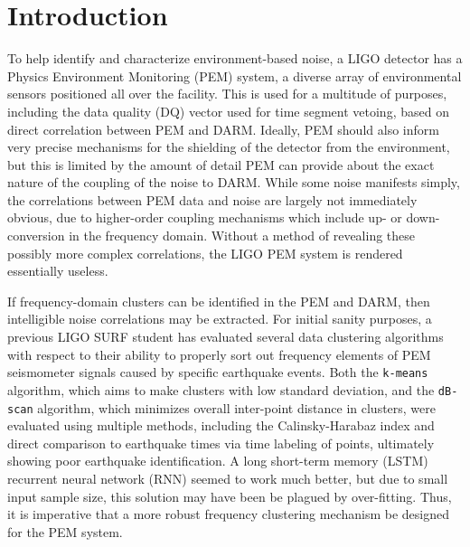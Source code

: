 \documentclass[colorlinks=true,pdfstartview=FitV,linkcolor=blue,
            citecolor=red,urlcolor=magenta]{ligodoc}
\title{}
\author{Jacob Bernhardt}
\begin{document}

\section{Introduction}

To help identify and characterize environment-based noise, a LIGO detector has a Physics Environment Monitoring (PEM) system, a diverse array of environmental sensors positioned all over the facility.
This is used for a multitude of purposes, including the data quality (DQ) vector used for time segment vetoing, based on direct correlation between PEM and DARM.
Ideally, PEM should also inform very precise mechanisms for the shielding of the detector from the environment, but this is limited by the amount of detail PEM can provide about the exact nature of the coupling of the noise to DARM.
While some noise manifests simply, the correlations between PEM data and noise are largely not immediately obvious, due to higher-order coupling mechanisms which include up- or down-conversion in the frequency domain.
Without a method of revealing these possibly more complex correlations, the LIGO PEM system is rendered essentially useless.

If frequency-domain clusters can be identified in the PEM and DARM, then intelligible noise correlations may be extracted. For initial sanity purposes, a previous LIGO SURF student has evaluated several data clustering algorithms with respect to their ability to properly sort out frequency elements of PEM seismometer signals caused by specific earthquake events\cite{roxana}.
Both the \texttt{k-means} algorithm, which aims to make clusters with low standard deviation, and the \texttt{dB-scan} algorithm, which minimizes overall inter-point distance in clusters, were evaluated using multiple methods, including the Calinsky-Harabaz  index and direct comparison to earthquake times via time labeling of points, ultimately showing poor earthquake identification.
A long short-term memory (LSTM) recurrent neural network (RNN) seemed to work much better, but due to small input sample size, this solution may have been be plagued by over-fitting.
Thus, it is imperative that a more robust frequency clustering mechanism be designed for the PEM system.
\end{document}
